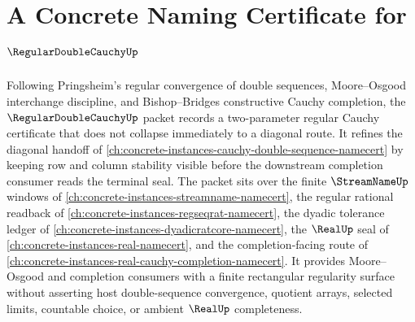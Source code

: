 \chapter{A Concrete Naming Certificate for $\RegularDoubleCauchyUp$}
\label{ch:concrete-instances-regular-double-cauchy-namecert}

Following Pringsheim's regular convergence of double sequences, Moore--Osgood interchange discipline, and Bishop--Bridges constructive Cauchy completion, the $\RegularDoubleCauchyUp$ packet records a two-parameter regular Cauchy certificate that does not collapse immediately to a diagonal route. It refines the diagonal handoff of \autoref{ch:concrete-instances-cauchy-double-sequence-namecert} by keeping row and column stability visible before the downstream completion consumer reads the terminal seal. The packet sits over the finite $\StreamNameUp$ windows of \autoref{ch:concrete-instances-streamname-namecert}, the regular rational readback of \autoref{ch:concrete-instances-regseqrat-namecert}, the dyadic tolerance ledger of \autoref{ch:concrete-instances-dyadicratcore-namecert}, the $\RealUp$ seal of \autoref{ch:concrete-instances-real-namecert}, and the completion-facing route of \autoref{ch:concrete-instances-real-cauchy-completion-namecert}. It provides Moore--Osgood and completion consumers with a finite rectangular regularity surface without asserting host double-sequence convergence, quotient arrays, selected limits, countable choice, or ambient $\RealUp$ completeness.

